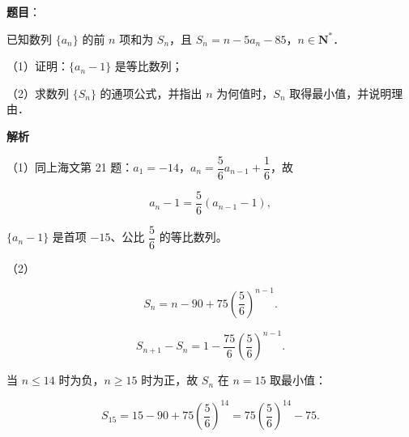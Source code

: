 \begin{answer}

\textbf{题目}：

已知数列 $\{a_n\}$ 的前 $n$ 项和为 $S_n$，且 $S_n=n-5a_n-85$，$n\in\mathbf N^*$．

（1）证明：$\{a_n-1\}$ 是等比数列；

（2）求数列 $\{S_n\}$ 的通项公式，并指出 $n$ 为何值时，$S_n$ 取得最小值，并说明理由．

\textbf{解析}

（1）同上海文第 21 题：$a_1=-14$，$a_n=\dfrac56a_{n-1}+\dfrac16$，故

\nopagebreak[4]
\[a_n-1=\frac56(a_{n-1}-1),\]

$\{a_n-1\}$ 是首项 $-15$、公比 $\dfrac56$ 的等比数列。

（2）

\nopagebreak[4]
\[S_n=n-90+75\left(\frac56\right)^{n-1}.\]

\nopagebreak[4]
\[S_{n+1}-S_n=1-\frac{75}6\left(\frac56\right)^{n-1}.\]

当 $n\leqslant14$ 时为负，$n\geqslant15$ 时为正，故 $S_n$ 在 $n=15$ 取最小值：

\nopagebreak[4]
\[S_{15}=15-90+75\left(\frac56\right)^{14}
=75\left(\frac56\right)^{14}-75.\]


\end{answer}
